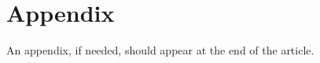 \documentclass{layout/tudelft-aiaa}
\begin{document}

\renewcommand{\bibpreamble}{For a full documentation of the references, please refer to the sample.bib file. You can delete this text/command safely in main.tex at line 63. \cite{example-article,example-article-published-online,example-inbook,example-inbook-series-with-editor,example-inproceedings,example-proceedings,example-report,example-paper,example-phdthesis}}




\section*{Appendix}

An appendix, if needed, should appear at the end of the article.
\end{document}
